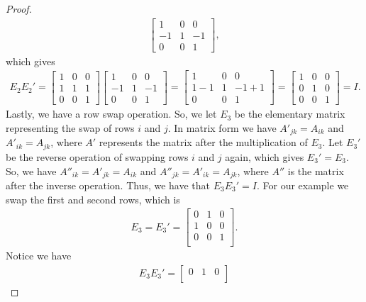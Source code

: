 \documentclass{article}
\begin{document}
\begin{flushleft}
\begin{proof}
\begin{align*}
\begin{bmatrix}
					1 & 0 & 0 \\
					-1 & 1 & -1 \\
					0 & 0 & 1
				\end{bmatrix},
			\end{align*}
			which gives 
			\begin{align*}
				E_2 E_2' = \begin{bmatrix}
					1 & 0 & 0 \\
					1 & 1 & 1 \\ 
					0 & 0 & 1
				\end{bmatrix}
				\begin{bmatrix}
					1 & 0 & 0 \\
					-1 & 1 & -1 \\
					0 & 0 & 1
				\end{bmatrix}
				= \begin{bmatrix}
					1 & 0 & 0 \\
					1 - 1 & 1 & -1 + 1 \\
					0 & 0 & 1
				\end{bmatrix}
				= \begin{bmatrix}
					1 & 0 & 0 \\
					0 & 1 & 0 \\
					0 & 0 & 1
				\end{bmatrix}
				= I.
			\end{align*}
			Lastly, we have a row swap operation. So, we let $E_3$ be the elementary matrix representing the swap of rows $i$ and $j$. In matrix form we have $A'_{jk} = A_{ik}$ and $A'_{ik} = A_{jk}$, where $A'$ represents the matrix after the multiplication of $E_3$. Let $E_3'$ be the reverse operation of swapping rows $i$ and $j$ again, which gives $E_3' = E_3$. So, we have $A''_{ik} = A'_{jk} = A_{ik}$ and $A''_{jk} = A'_{ik} = A_{jk}$, where $A''$ is the matrix after the inverse operation. Thus, we have that $E_3 E_3' = I$. For our example we swap the first and second rows, which is
			\begin{align*}
				E_3 = E_3' = \begin{bmatrix}
					0 & 1 & 0 \\
					1 & 0 & 0 \\
					0 & 0 & 1 \\
				\end{bmatrix}.
			\end{align*}
			Notice we have
			\begin{align*}
				E_3 E_3' = \begin{bmatrix}
					0 & 1 & 0 \\

\end{bmatrix}
\end{align*}
\end{proof}
\end{flushleft}
\end{document}
